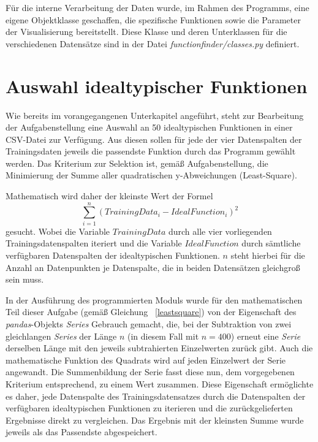 Für die interne Verarbeitung der Daten wurde, im Rahmen des Programms, eine eigene Objektklasse geschaffen, die spezifische Funktionen sowie die Parameter der Visualisierung bereitstellt. Diese Klasse und deren Unterklassen für die verschiedenen Datensätze sind in der Datei \emph{functionfinder/classes.py} definiert.

\section{Auswahl idealtypischer Funktionen}

Wie bereits im vorangegangenen Unterkapitel angeführt, steht zur Bearbeitung der Aufgabenstellung eine Auswahl an 50 idealtypischen Funktionen in einer CSV-Datei zur Verfügung. Aus diesen sollen für jede der vier Datenspalten der Trainingsdaten jeweils die passendste Funktion durch das Programm gewählt werden. Das Kriterium zur Selektion ist, gemäß Aufgabenstellung, die Minimierung der Summe aller quadratischen y-Abweichungen (Least-Square).

Mathematisch wird daher der kleinste Wert der Formel
\begin{equation}  
\sum_{i=1}^{n}(TrainingData_{i} - IdealFunction_{i})^2
\label{leastsquare}
\end{equation}
gesucht. Wobei die Variable $TrainingData$ durch alle vier vorliegenden Trainingsdatenspalten iteriert und die Variable $IdealFunction$ durch sämtliche verfügbaren Datenspalten der idealtypischen Funktionen. $n$ steht hierbei für die Anzahl an Datenpunkten je Datenspalte, die in beiden Datensätzen gleichgroß sein muss. 

In der Ausführung des programmierten Moduls wurde für den mathematischen Teil dieser Aufgabe (gemäß Gleichung ~\ref{leastsquare})  von der Eigenschaft des \emph{pandas}-Objekts \emph{Series} Gebrauch gemacht, die, bei der Subtraktion von zwei gleichlangen \emph{Series} der Länge $n$ (in diesem Fall mit $n=400$) erneut eine \emph{Serie} derselben Länge mit den jeweils subtrahierten Einzelwerten zurück gibt. Auch die mathematische Funktion des Quadrats wird auf jeden Einzelwert der Serie angewandt. Die Summenbildung der Serie fasst diese nun, dem vorgegebenen Kriterium entsprechend, zu einem Wert zusammen.
Diese Eigenschaft ermöglichte es daher, jede Datenspalte des Trainingsdatensatzes durch die Datenspalten der verfügbaren idealtypischen Funktionen zu iterieren und die zurückgelieferten Ergebnisse direkt zu vergleichen. Das Ergebnis mit der kleinsten Summe wurde jeweils als das Passendste abgespeichert.

